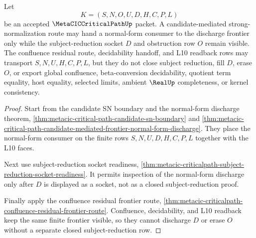 \begin{theorem}
\label{thm:metacic-critical-path-sn-discharge-frontier}
Let
$$
K=(S,N,O,U,D,H,C,P,L)
$$
be an accepted $\MetaCICCriticalPathUp$ packet. A candidate-mediated strong-normalization route may hand a normal-form consumer to the discharge frontier only while the subject-reduction socket $D$ and obstruction row $O$ remain visible. The confluence residual route, decidability handoff, and L10 readback rows may transport $S,N,U,H,C,P,L$, but they do not close subject reduction, fill $D$, erase $O$, or export global confluence, beta-conversion decidability, quotient term equality, host equality, selected limits, ambient $\RealUp$ completeness, or kernel consistency.
\end{theorem}
\begin{proof}
Start from the candidate SN boundary and the normal-form discharge theorem, \autoref{thm:metacic-critical-path-candidate-sn-boundary} and \autoref{thm:metacic-critical-path-candidate-mediated-frontier-normal-form-discharge}. They place the normal-form consumer on the finite rows $S,N,U,D,H,C,P,L$ together with the L10 faces.

Next use subject-reduction socket readiness, \autoref{thm:metacic-criticalpath-subject-reduction-socket-readiness}. It permits inspection of the normal-form discharge only after $D$ is displayed as a socket, not as a closed subject-reduction proof.

Finally apply the confluence residual frontier route, \autoref{thm:metacic-criticalpath-confluence-residual-frontier-route}. Confluence, decidability, and L10 readback keep the same finite frontier visible, so they cannot discharge $D$ or erase $O$ without a separate closed subject-reduction row.
\end{proof}

